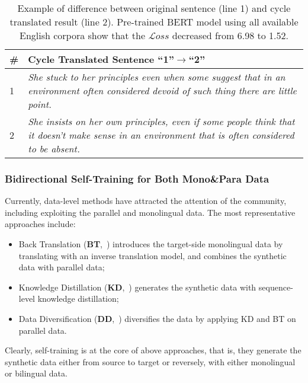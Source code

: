 \documentclass[11pt,a4paper]{article}
\newcommand{\zct}{\color{black}}
\begin{document}
\begin{table}[t!]
    \begin{center}
    \begin{tabular}{lp{6.4cm}}
    \toprule
    \# & \textbf{Cycle Translated Sentence ``1''$\rightarrow$``2''}\\
    \midrule
    1 & \textit{She stuck to her principles even when some suggest that in an environment often considered devoid of such thing there are little point.}\\ 
    \midrule
    2 & \textit{She insists on her own principles, even if some people think that it doesn't make sense in an environment that is often considered to be absent.}\\ 
    \bottomrule
    \end{tabular}
    \end{center}
    \caption{\label{tab:sentences}Example of difference between original sentence (line 1) and cycle translated result (line 2). Pre-trained BERT model using all available English corpora show that the $\mathcal{L}oss$ decreased from 6.98 to 1.52.}
    \end{table}

\subsubsection{Bidirectional Self-Training for Both Mono\&Para Data}
\label{ssec:bi-selftraining}
Currently, data-level methods have attracted the attention of the community, including exploiting the parallel and monolingual data.
The most representative approaches include: 
{\zct
\begin{itemize}
    \item Back Translation (\textbf{BT},~\citealt{sennrich-etal-2016-improving}) introduces the target-side monolingual data by translating with an inverse translation model, and combines the synthetic data with parallel data;
    \item Knowledge Distillation (\textbf{KD},~\citealt{kim-rush-2016-sequence}) generates the synthetic data with sequence-level knowledge distillation; 
    \item Data Diversification (\textbf{DD},~\citealt{NEURIPS2020_7221e5c8}) diversifies the data by applying KD and BT on parallel data. 
\end{itemize}
}
Clearly, self-training is at the core of above approaches, that is, they generate the synthetic data either from source to target or reversely, with either monolingual or bilingual data. 
\end{document}
